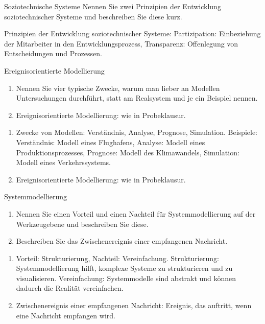 \documentclass{article}
\begin{document}
\begin{exercise}{Soziotechnische Systeme}
  Nennen Sie zwei Prinzipien der Entwicklung soziotechnischer Systeme und beschreiben Sie diese kurz.

  \begin{solution}
    Prinzipien der Entwicklung soziotechnischer Systeme: Partizipation: Einbeziehung der Mitarbeiter in den Entwicklungsprozess, Transparenz: Offenlegung von Entscheidungen und Prozessen.
  \end{solution}
\end{exercise}



\begin{exercise}{Ereignisorientierte Modellierung}
  \begin{enumerate}
    \item Nennen Sie vier typische Zwecke, warum man lieber an Modellen Untersuchungen durchführt, statt am Realsystem und je ein Beispiel nennen.
    \item Ereignisorientierte Modellierung: wie in Probeklausur.
  \end{enumerate}

  \begin{solution}
    \begin{enumerate}
      \item Zwecke von Modellen: Verständnis, Analyse, Prognose, Simulation. Beispiele: Verständnis: Modell eines Flughafens, Analyse: Modell eines Produktionsprozesses, Prognose: Modell des Klimawandels, Simulation: Modell eines Verkehrssystems.
      \item Ereignisorientierte Modellierung: wie in Probeklausur.
    \end{enumerate}
  \end{solution}
\end{exercise}

\begin{exercise}{Systemmodellierung}
  \begin{enumerate}
    \item Nennen Sie einen Vorteil und einen Nachteil für Systemmodellierung auf der Werkzeugebene und beschreiben Sie diese.
    \item Beschreiben Sie das Zwischenereignis einer empfangenen Nachricht.
  \end{enumerate}

  \begin{solution}
    \begin{enumerate}
      \item Vorteil: Strukturierung, Nachteil: Vereinfachung. Strukturierung: Systemmodellierung hilft, komplexe Systeme zu strukturieren und zu visualisieren. Vereinfachung: Systemmodelle sind abstrakt und können dadurch die Realität vereinfachen.
      \item Zwischenereignis einer empfangenen Nachricht: Ereignis, das auftritt, wenn eine Nachricht empfangen wird.
    \end{enumerate}
  \end{solution}
\end{exercise}
\end{document}
